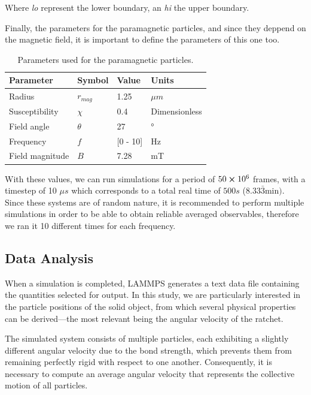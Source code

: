 Where \textit{lo} represent the lower boundary, an \textit{hi} the upper boundary.

Finally, the parameters for the paramagnetic particles, and since they deppend on the magnetic field, it is important to define the parameters of this one too.


\begin{table}[H]
\centering
\caption[Paramagnetic colloids parameters.]{Parameters used for the paramagnetic particles.}
\begin{tabular}{l l l l}
\hline
Parameter & Symbol  & Value & Units \\
\hline
Radius & $r_{mag}$ &  1.25 &\( \mu m\) \\
Susceptibility & $\chi$ & 0.4 & Dimensionless\\
Field angle & $\theta$ & 27 & °\\
Frequency & $f$ & [0 - 10] & Hz\\
Field magnitude & $B$ & 7.28 & mT\\
\hline
\end{tabular}
\end{table}

With these values, we can run simulations for a period of $50 \cross 10^6$ frames, with a timestep of 10 $\mu s$ which corresponds to a total real time of $500 s$ ($8.33\bar{3} \mathrm{min})$. Since these systems are of random nature, it is recommended to perform multiple simulations in order to be able to obtain reliable averaged observables, therefore we ran it 10 different times for each frequency.

\subsection{Data Analysis}

When a simulation is completed, LAMMPS generates a text data file containing the quantities selected for output. In this study, we are particularly interested in the particle positions of the solid object, from which several physical properties can be derived—the most relevant being the angular velocity of the ratchet.

The simulated system consists of multiple particles, each exhibiting a slightly different angular velocity due to the bond strength, which prevents them from remaining perfectly rigid with respect to one another. Consequently, it is necessary to compute an average angular velocity that represents the collective motion of all particles.

